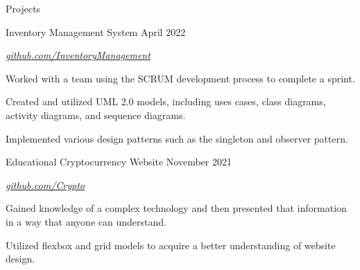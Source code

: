 \documentclass{resume} %
\begin{document}
\begin{rSection}{Projects}
\begin{rSubsection}{Inventory Management System } {April 2022}{}{}
\item[]\href{https://github.com/turnerburchard/322-inventory}{\emph{github.com/InventoryManagement}}
\item Worked with a team using the SCRUM development process to complete a sprint.
\item Created and utilized UML 2.0 models, including uses cases, class diagrams, activity diagrams, and sequence diagrams.
\item Implemented various design patterns such as the singleton and observer pattern.
\end{rSubsection}
\begin{rSubsection}{Educational Cryptocurrency Website} {November 2021}{}{}
\item[]\href{https://github.com/Ezra1285/CryptoEducation}{\emph{github.com/Crypto}}
\item Gained knowledge of a complex technology and then presented that information in a way that anyone can understand.
\item Utilized flexbox and grid models to acquire a better understanding of website design.
\end{rSubsection}
\iffalse
\begin{rSubsection}{UUP SIAM - Direct Tap Machine Learning}{April 2017 - Present}{}{City One, UP}
\item Built a model to visualize the correlation between order quantity and seasonality, using Python pandas and matplotlib
\end{rSubsection}
\fi
\iffalse
\begin{rSubsection}{JavaScript 8 Puzzle Solver}{December 2016}{}{}
\item Developed a sliding puzzle solver in pure JavaScript to animate a step by step solution
\item Is able to solve 3x3 tile board in less than 1 second using the A* algorithm
\end{rSubsection}
\fi
\end{rSection}
\end{document}
